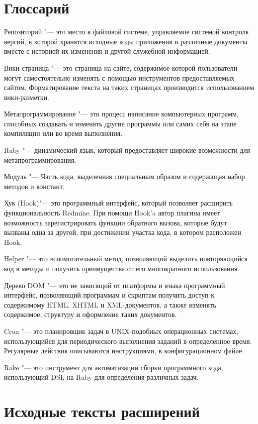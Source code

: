 \appendix

\makeatletter
\gdef\thechapter{\@Asbuk\c@chapter}
\makeatother

\chapter{Глоссарий}
\label{glossary}
Репозиторий "--- это место в файловой системе, управляемое системой контроля
версий, в которой хранятся исходные коды приложения и различные документы
вместе с историей их изменения и другой служебной информацией.

Вики-страница "--- это страница на сайте, содержимое которой пользователи
могут самостоятельно изменять с помощью инструментов предоставляемых сайтом.
Форматирование текста на таких страницах производится использованием
вики-разметки.

Метапрограммирование "--- это процесс написание компьютерных программ,
способных создавать и изменять другие программы или самих себя на этапе
компиляции или во время выполнения.

Ruby "--- динамический язык, который предоставляет широкие возможности для
метапрограммирования.

Модуль "--- Часть кода, выделенная специальным образом и
содержащая набор методов и констант.

Хук (Hook)"--- это программный интерфейс, который позволяет расширить
функциональность Redmine. При помощи Hook'a автор плагина имеет возможность
зарегистрировать функции обратного вызова, которые будут вызваны одна за
другой, при достижении участка кода, в котором расположен Hook.

Helper "--- это вспомогательный метод, позволяющий выделить
повторяющийся код в методы и получить преимущества от его многократного
использования.

Дерево DOM "---  это не зависящий от платформы и языка программный интерфейс,
позволяющий программам и скриптам получить доступ к содержимому HTML, XHTML и
XML-документов, а также изменять содержимое, структуру и оформление таких
документов.

Cron "--- это планировщик задач в UNIX-подобных операционных системах,
использующийся для периодического выполнения заданий в определённое время.
Регулярные действия описываются инструкциями, в конфигурационном файле.

Rake "--- это инструмент для автоматизации сборки программного кода,
использующий DSL на Ruby для определения различных задач.


\chapter{Исходные тексты расширений}

